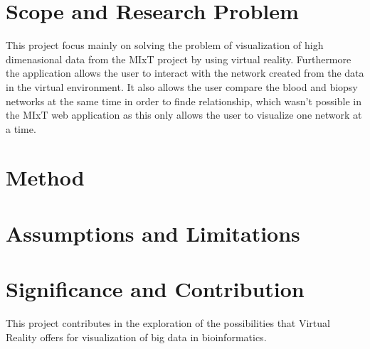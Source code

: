 \section{Scope and Research Problem}
This project focus mainly on solving the problem of visualization of high dimenasional data from the MIxT project by using virtual reality. Furthermore the application allows the user to interact with the network created from the data in the virtual environment. It also allows the user compare the blood and biopsy networks at the same time in order to finde relationship, which wasn't possible in the MIxT web application as this only allows the user to visualize one network at a time.

\section{Method}

\section{Assumptions and Limitations}

\section{Significance and Contribution}
This project contributes in the exploration of the possibilities that Virtual Reality offers for visualization of big data in bioinformatics.

